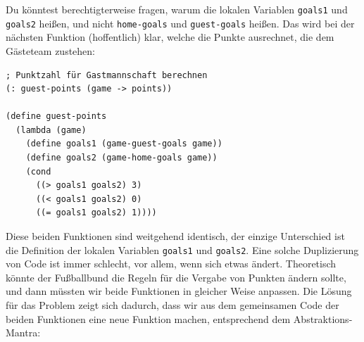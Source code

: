 %
Du könntest berechtigterweise fragen, warum die lokalen Variablen
\lstinline{goals1} und \lstinline{goals2} heißen, und nicht
\lstinline{home-goals} und \lstinline{guest-goals} heißen.  Das wird
bei der nächsten Funktion (hoffentlich) klar, welche die Punkte
ausrechnet, die dem Gästeteam zustehen:
%
\begin{lstlisting}
; Punktzahl für Gastmannschaft berechnen
(: guest-points (game -> points))

(define guest-points
  (lambda (game)
    (define goals1 (game-guest-goals game))
    (define goals2 (game-home-goals game))
    (cond
      ((> goals1 goals2) 3)
      ((< goals1 goals2) 0)
      ((= goals1 goals2) 1))))
\end{lstlisting}
%
Diese beiden Funktionen sind weitgehend identisch, der einzige
Unterschied ist die Definition der lokalen Variablen
\lstinline{goals1} und \lstinline{goals2}. Eine solche Duplizierung
von Code ist immer schlecht, vor allem, wenn sich etwas
ändert. Theoretisch könnte der Fußballbund die Regeln für die Vergabe
von Punkten ändern sollte, und dann müssten wir beide Funktionen in
gleicher Weise anpassen.  Die Lösung für das Problem zeigt sich
dadurch, dass wir aus dem gemeinsamen Code der beiden Funktionen
eine neue Funktion machen, entsprechend dem Abstraktions-Mantra:

\mantraabstraktion*

